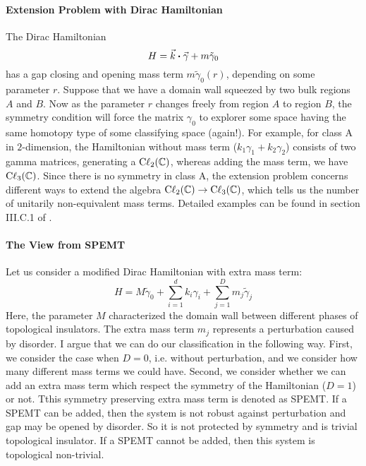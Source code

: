 \paragraph{Extension Problem with Dirac Hamiltonian}
The Dirac Hamiltonian
\begin{equation}
    H = \vec{k}\vdot \vec{\gamma} + m\tilde{\gamma}_0
\end{equation}
has a gap closing and opening mass term $m\tilde{\gamma}_0(r)$, depending on some
parameter $r$. Suppose that we have a domain wall squeezed by two bulk regions
$A$ and $B$. Now as the parameter $r$ changes freely from region $A$ to region
$B$, the symmetry condition will force the matrix $\gamma_0$ to explorer some
space having the same homotopy type of some classifying space (again!). For
example, for class $\mathrm{A}$ in $2$-dimension, the Hamiltonian without mass
term ($k_1\gamma_1 + k_2\gamma_2$) consists of two gamma matrices, generating a
$\mathrm{C\ell}_{2}(\mathbb{C})$, whereas adding the mass term, we have
$\mathrm{C\ell}_{3}(\mathbb{C})$. Since there is no symmetry in class $\mathrm{A}$, the
extension problem concerns different ways to extend the algebra
$\mathrm{C\ell}_{2}(\mathbb{C})\to \mathrm{C\ell}_{3}(\mathbb{C})$, which tells us the number of
unitarily non-equivalent mass terms. Detailed examples can be found in section
III.C.1 of \cite{Chiu2016}.













\paragraph{The View from SPEMT} Let us consider a modified Dirac Hamiltonian
with extra mass term:
\begin{equation}
    \label{eq:H-spemt}
    H = M\tilde{\gamma}_0 + \sum_{i=1}^{d} k_i \gamma_i 
    + \sum_{j=1}^D m_j\tilde{\gamma}_j
\end{equation}
Here, the parameter $M$ characterized the domain wall between different phases
of topological insulators. The extra mass term $m_j$ represents a perturbation
caused by disorder. I argue that we can do our classification in the following
way. First, we consider the case when $D=0$, i.e. without perturbation, and we
consider how many different mass terms we could have. Second, we consider whether we can add
an extra mass term which respect the symmetry of the Hamiltonian ($D=1$) or not.
Tthis symmetry preserving extra mass term is denoted as SPEMT. If
a SPEMT can be added, then the system is not robust against perturbation and gap
may be opened by disorder. So it is not protected by symmetry and is trivial topological insulator. If a SPEMT cannot be added, then this system is topological non-trivial. 


